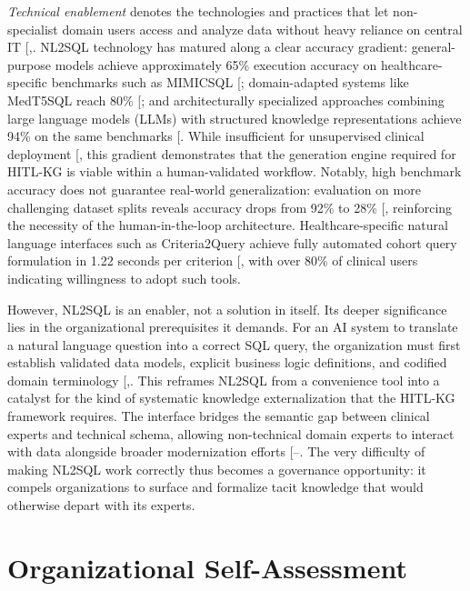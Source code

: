 \documentclass[
  american,
  11pt,
  letterpaper,
  oneside  ,captions=tableheading
]{scrartcl}
\begin{document}
\emph{Technical enablement} denotes the technologies and practices that
let non-specialist domain users access and analyze data without heavy
reliance on central IT
{[},\citeproc{ref-banihani2020}{55}{]}.
NL2SQL technology has matured along a clear accuracy gradient:
general-purpose models achieve approximately 65\% execution accuracy on
healthcare-specific benchmarks such as MIMICSQL
{[}\citeproc{ref-blaskovic2025}{56}{]}; domain-adapted systems like
MedT5SQL reach 80\% {[}\citeproc{ref-marshan2024}{57}{]}; and
architecturally specialized approaches combining large language models
(LLMs) with structured knowledge representations achieve 94\% on the
same benchmarks {[}\citeproc{ref-chen2026graph}{58}{]}. While
insufficient for unsupervised clinical deployment
{[}\citeproc{ref-ziletti2024}{38}{]}, this gradient demonstrates that
the generation engine required for HITL-KG is viable within a
human-validated workflow. Notably, high benchmark accuracy does not
guarantee real-world generalization: evaluation on more challenging
dataset splits reveals accuracy drops from 92\% to 28\%
{[}\citeproc{ref-tarbell2024}{59}{]}, reinforcing the necessity of the
human-in-the-loop architecture. Healthcare-specific natural language
interfaces such as Criteria2Query achieve fully automated cohort query
formulation in 1.22 seconds per criterion
{[}\citeproc{ref-yuan2019}{60}{]}, with over 80\% of clinical users
indicating willingness to adopt such tools.

However, NL2SQL is an enabler, not a solution in itself. Its deeper
significance lies in the organizational prerequisites it demands. For an
AI system to translate a natural language question into a correct SQL
query, the organization must first establish validated data models,
explicit business logic definitions, and codified domain terminology
{[},\citeproc{ref-zhang2024}{4}{]}. This
reframes NL2SQL from a convenience tool into a catalyst for the kind of
systematic knowledge externalization that the HITL-KG framework
requires. The interface bridges the semantic gap between clinical
experts and technical schema, allowing non-technical domain experts to
interact with data alongside broader modernization efforts
{[}--\citeproc{ref-arora2025}{64}{]}.
The very difficulty of making NL2SQL work correctly thus becomes a
governance opportunity: it compels organizations to surface and
formalize tacit knowledge that would otherwise depart with its experts.

\section{Organizational
Self-Assessment}\label{organizational-self-assessment}
\end{document}
